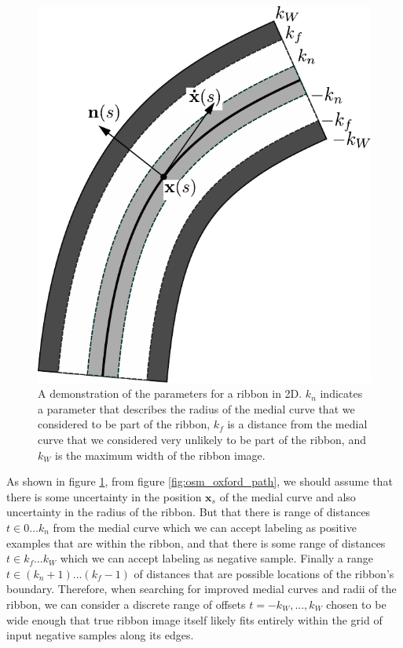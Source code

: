 \begin{figure}[H]
    \centering \includegraphics[width=\textwidth]{Figures/sw-figure.pdf} \caption[2D Ribbon Image]{
    A demonstration of the parameters for a ribbon in 2D. $k_n$ indicates a parameter that describes
    the radius of the medial curve that we considered to be part of the ribbon, $k_f$ is a distance
    from the medial curve that we considered very unlikely to be part of the ribbon, and $k_W$ is
    the maximum width of the ribbon image.} \label{fig:2d_ribbon}
\end{figure}

As shown in figure \ref{fig:2d_ribbon}, from figure \ref{fig:osm_oxford_path}, we should assume that
there is some uncertainty in the position $\mathbf{x}_s$ of the medial curve and also uncertainty in
the radius of the ribbon. But that there is range of distances $t \in 0\dots k_n$
from the medial curve which we can accept labeling as positive examples that are within the ribbon,
and that there is some range of distances $t \in k_f\dots k_W$ which we can accept labeling as
negative sample. Finally a range $t\in (k_n+1)...(k_f-1)$ of distances that are possible locations
of the ribbon's boundary. Therefore, when searching for improved medial curves and radii of the
ribbon, we can consider a discrete range of offsets $t=-k_W,..., k_W$ chosen to be wide enough that
true ribbon image itself likely fits entirely within the grid of input negative samples along its
edges.

